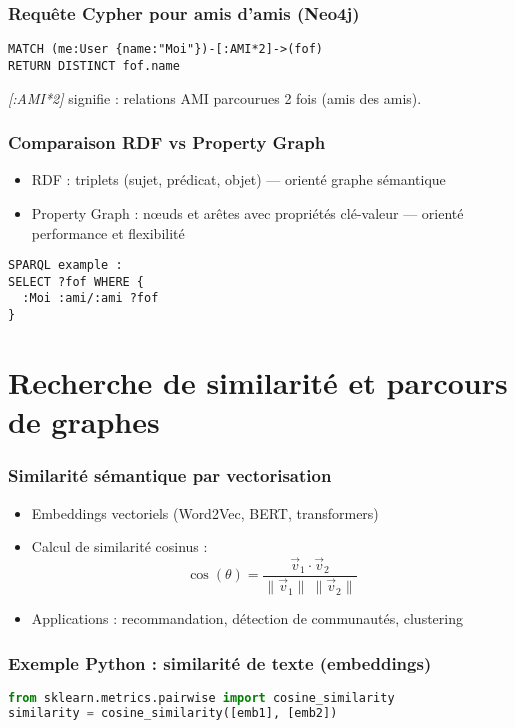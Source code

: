 \documentclass{beamer}
\begin{document}
\begin{frame}[fragile]
  \frametitle{Requête Cypher pour amis d’amis (Neo4j)}
\begin{lstlisting}
MATCH (me:User {name:"Moi"})-[:AMI*2]->(fof)
RETURN DISTINCT fof.name
\end{lstlisting}
\pause
\textit{[:AMI*2]} signifie : relations AMI parcourues 2 fois (amis des amis).
\end{frame}

\begin{frame}
  \frametitle{Comparaison RDF vs Property Graph}
  \begin{itemize}
    \item RDF : triplets (sujet, prédicat, objet) — orienté graphe sémantique
    \item Property Graph : nœuds et arêtes avec propriétés clé-valeur — orienté performance et flexibilité
  \end{itemize}
\begin{lstlisting}
SPARQL example :
SELECT ?fof WHERE {
  :Moi :ami/:ami ?fof
}
\end{lstlisting}
\end{frame}

\section{Recherche de similarité et parcours de graphes}

\begin{frame}
  \frametitle{Similarité sémantique par vectorisation}
  \begin{itemize}
    \item Embeddings vectoriels (Word2Vec, BERT, transformers)
    \item Calcul de similarité cosinus :
  \[
  \cos(\theta) = \frac{\vec{v}_1 \cdot \vec{v}_2}{\|\vec{v}_1\| \ \|\vec{v}_2\|}
  \]
  \item Applications : recommandation, détection de communautés, clustering
  \end{itemize}
\end{frame}

\begin{frame}[fragile]
  \frametitle{Exemple Python : similarité de texte (embeddings)}
\begin{lstlisting}[language=Python]
from sklearn.metrics.pairwise import cosine_similarity
similarity = cosine_similarity([emb1], [emb2])
\end{lstlisting}
\end{frame}
\end{document}
